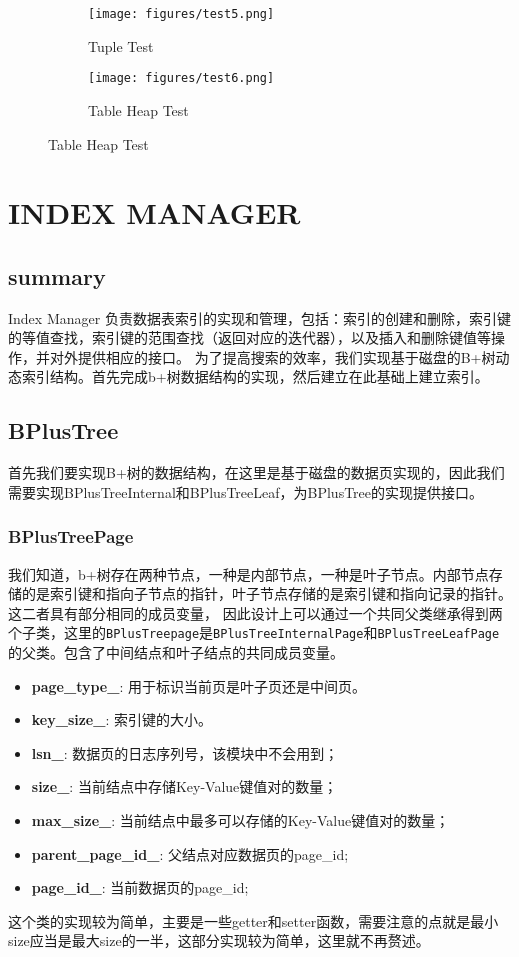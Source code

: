\documentclass[12pt,hyperref,a4paper,UTF8]{ctexart}
\begin{document}
\begin{figure}[!htbp]
  \centering
  \begin{subfigure}
    \centering
    \texttt{[image: figures/test5.png]}
    \caption{Tuple Test}
    \label{tuple_test}
  \end{subfigure}
  \begin{subfigure}
    \centering
    \texttt{[image: figures/test6.png]}
    \caption{Table Heap Test}
    \label{table_heap_test}
  \end{subfigure}
\end{figure}

\section{INDEX MANAGER}
\subsection{summary}
Index Manager 负责数据表索引的实现和管理，包括：索引的创建和删除，索引键的等值查找，索引键的范围查找（返回对应的迭代器），以及插入和删除键值等操作，并对外提供相应的接口。
为了提高搜索的效率，我们实现基于磁盘的B+树动态索引结构。首先完成b+树数据结构的实现，然后建立在此基础上建立索引。

\subsection{BPlusTree}
首先我们要实现B+树的数据结构，在这里是基于磁盘的数据页实现的，因此我们需要实现BPlusTreeInternal和BPlusTreeLeaf，为BPlusTree的实现提供接口。
\subsubsection{BPlusTreePage}
我们知道，b+树存在两种节点，一种是内部节点，一种是叶子节点。内部节点存储的是索引键和指向子节点的指针，叶子节点存储的是索引键和指向记录的指针。这二者具有部分相同的成员变量，
因此设计上可以通过一个共同父类继承得到两个子类，这里的\verb|BPlusTreepage|是\verb|BPlusTreeInternalPage|和\verb|BPlusTreeLeafPage|的父类。包含了中间结点和叶子结点的共同成员变量。
\begin{itemize}
  \item \textbf{page\_type\_}: 用于标识当前页是叶子页还是中间页。
  \item \textbf{key\_size\_}: 索引键的大小。
  \item \textbf{lsn\_}: 数据页的日志序列号，该模块中不会用到；
  \item \textbf{size\_}: 当前结点中存储Key-Value键值对的数量；
  \item \textbf{max\_size\_}: 当前结点中最多可以存储的Key-Value键值对的数量；
  \item \textbf{parent\_page\_id\_}: 父结点对应数据页的page\_id;
  \item \textbf{page\_id\_}: 当前数据页的page\_id;
\end{itemize}
这个类的实现较为简单，主要是一些getter和setter函数，需要注意的点就是最小size应当是最大size的一半，这部分实现较为简单，这里就不再赘述。
\end{document}
